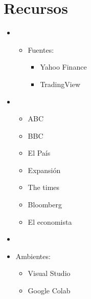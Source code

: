 \documentclass[letterpaper,10pt,spanish]{sphinxmanual}
\begin{document}
\section{Recursos}
\label{\detokenize{DescripcionProblema:recursos}}\begin{itemize}
\item {} 
\sphinxAtStartPar
{}
\begin{itemize}
\item {} 
\sphinxAtStartPar
Fuentes:
\begin{itemize}
\item {} 
\sphinxAtStartPar
Yahoo Finance

\item {} 
\sphinxAtStartPar
TradingView

\end{itemize}

\end{itemize}

\item {} 
\sphinxAtStartPar
{}
\begin{itemize}
\item {} 
\sphinxAtStartPar
ABC

\item {} 
\sphinxAtStartPar
BBC

\item {} 
\sphinxAtStartPar
El País

\item {} 
\sphinxAtStartPar
Expansión

\item {} 
\sphinxAtStartPar
The times

\item {} 
\sphinxAtStartPar
Bloomberg

\item {} 
\sphinxAtStartPar
El economista

\end{itemize}

\item {} 
\sphinxAtStartPar
{}

\item {} 
\sphinxAtStartPar
Ambientes:
\begin{itemize}
\item {} 
\sphinxAtStartPar
Visual Studio

\item {} 
\sphinxAtStartPar
Google Colab


\end{itemize}
\end{itemize}
\end{document}
